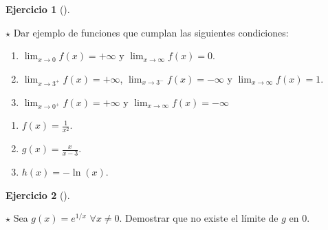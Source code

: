 \documentclass[
  spanish,
  a4paper,
]{scrreport}
\theoremstyle{definition}
\newtheorem{exercise}{Ejercicio}[chapter]
\theoremstyle{remark}
\begin{document}
\begin{exercise}[]\protect\hypertarget{exr-ejemplos-limites-laterales}{}\label{exr-ejemplos-limites-laterales}

\(\star\) Dar ejemplo de funciones que cumplan las siguientes
condiciones:

\begin{enumerate}
\def\labelenumi{\alph{enumi}.}
\item
  \(\lim_{x\to 0}f(x)=+\infty\) y \(\lim_{x\to \infty}f(x)=0\).
\item
  \(\lim_{x\to 3^+}f(x)=+\infty\), \(\lim_{x\to 3^-}f(x)=-\infty\) y
  \(\lim_{x\to \infty}f(x)=1\).
\item
  \(\lim_{x\to 0^+}f(x)=+\infty\) y \(\lim_{x\to \infty}f(x)=-\infty\)
\end{enumerate}

\end{exercise}

\begin{tcolorbox}[enhanced jigsaw, arc=.35mm, bottomrule=.15mm, bottomtitle=1mm, breakable, colback=white, colbacktitle=quarto-callout-tip-color!10!white, colframe=quarto-callout-tip-color-frame, coltitle=black, left=2mm, leftrule=.75mm, opacityback=0, opacitybacktitle=0.6, rightrule=.15mm, title=\textcolor{quarto-callout-tip-color}{\faLightbulb}\hspace{0.5em}{Solución}, titlerule=0mm, toprule=.15mm, toptitle=1mm]

\begin{enumerate}
\def\labelenumi{\alph{enumi}.}
\item
  \(f(x)=\frac{1}{x^2}\).
\item
  \(g(x)=\frac{x}{x-3}\).
\item
  \(h(x)=-\ln(x)\).
\end{enumerate}

\end{tcolorbox}

\begin{exercise}[]\protect\hypertarget{exr-limite-laterales}{}\label{exr-limite-laterales}

\(\star\) Sea \(g(x)=e^{1/x}\) \(\forall x\neq 0\). Demostrar que no
existe el límite de \(g\) en \(0\).

\end{exercise}
\end{document}
